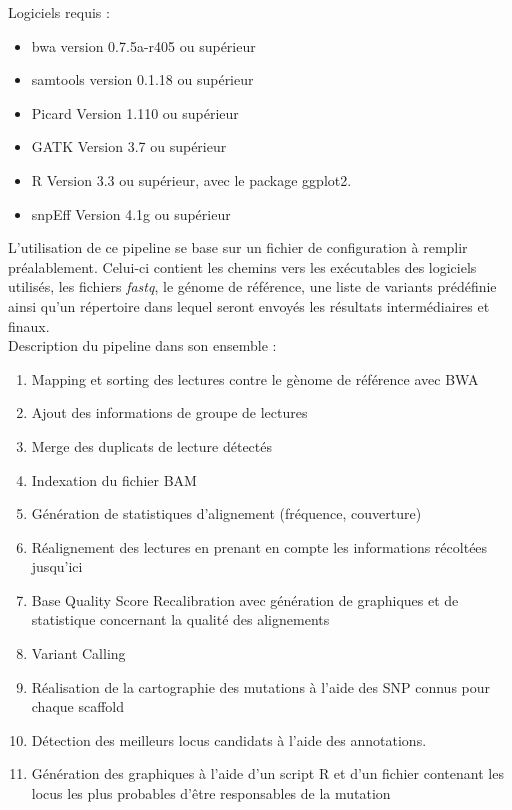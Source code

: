 \documentclass[12pt]{article}
\begin{document}
Logiciels requis :

\begin{itemize}
\item bwa version 0.7.5a-r405 ou supérieur
\item samtools version 0.1.18 ou supérieur
\item Picard Version 1.110 ou supérieur
\item GATK Version 3.7 ou supérieur
\item R Version 3.3 ou supérieur, avec le package ggplot2.
\item snpEff Version 4.1g ou supérieur
\end{itemize}


L'utilisation de ce pipeline se base sur un fichier de configuration à remplir préalablement. Celui-ci contient les chemins vers les exécutables des logiciels utilisés, les fichiers \textit{fastq}, le génome de référence, une liste de variants prédéfinie ainsi qu'un répertoire dans lequel seront envoyés les résultats intermédiaires et finaux.\\

Description du pipeline dans son ensemble :
\begin{enumerate}
\item Mapping et sorting des lectures contre le gènome de référence avec BWA
\item Ajout des informations de groupe de lectures
\item Merge des duplicats de lecture détectés
\item Indexation du fichier BAM
\item Génération de statistiques d'alignement (fréquence, couverture)
\item Réalignement des lectures en prenant en compte les informations récoltées jusqu'ici
\item Base Quality Score Recalibration avec génération de graphiques et de statistique concernant la qualité des alignements
\item Variant Calling
\item Réalisation de la cartographie des mutations à l'aide des SNP connus pour chaque scaffold
\item Détection des meilleurs locus candidats à l'aide des annotations.
\item Génération des graphiques à l'aide d'un script R et d'un fichier contenant les locus les plus probables d'être responsables de la mutation
\end{enumerate}
\end{document}
